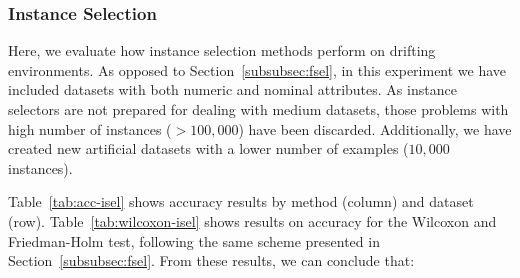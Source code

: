 \documentclass[preprint,12pt]{elsarticle}
\begin{document}



\subsubsection{\textbf{Instance Selection}}

Here, we evaluate how instance selection methods perform on drifting environments. As opposed to Section~\ref{subsubsec:fsel}, in this experiment we have included datasets with both numeric and nominal attributes. As instance selectors are not prepared for dealing with medium datasets, those problems with high number of instances ($> 100,000$) have been discarded. Additionally, we have created new artificial datasets with a lower number of examples ($10,000$ instances). 

Table~\ref{tab:acc-isel} shows accuracy results by method (column) and dataset (row). Table~\ref{tab:wilcoxon-isel} shows results on accuracy for the Wilcoxon and Friedman-Holm test, following the same scheme presented in Section~\ref{subsubsec:fsel}. From these results, we can conclude that: 
\end{document}
